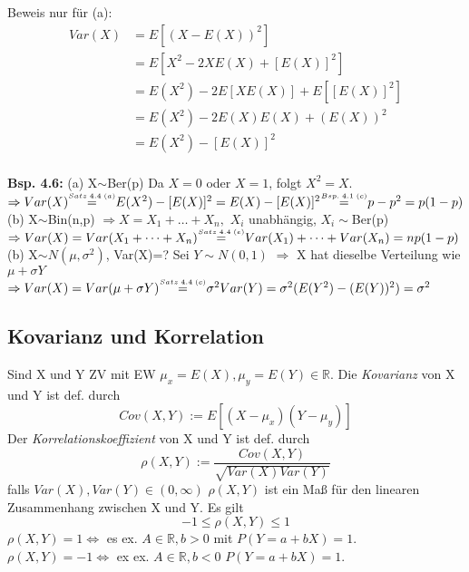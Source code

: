 \documentclass[a4paper,11pt]{article}
\newcommand\sfofoa{\overset{\mathclap{\scriptscriptstyle Satz \hspace{2pt} 4.4 \hspace{2pt} (a)}}{=}}
\newcommand\bspfoonc{\overset{\mathclap{\scriptscriptstyle Bsp. \hspace{2pt} 4.1 \hspace{2pt} (c)}}{=}}
\newcommand\sfofoe{\overset{\mathclap{\scriptscriptstyle Satz \hspace{2pt} 4.4 \hspace{2pt} (e)}}{=}}
\newcommand\sfofoc{\overset{\mathclap{\scriptscriptstyle Satz \hspace{2pt} 4.4 \hspace{2pt} (c)}}{=}}
\begin{document}
\noindent Beweis nur für (a):
\begin{align*}
Var(X) &= E[(X-E(X))^2]\\
&= E[X^2-2XE(X)+[E(X)]^2]\\
&= E(X^2)-2E[XE(X)]+E[[E(X)]^2]\\
&= E(X^2) - 2E(X)E(X) + (E(X))^2\\
&= E(X^2)-[E(X)]^2\\
\end{align*}

\vspace{6pt}
\noindent\textbf{Bsp. 4.6:} (a) X$\sim$Ber(p)
\newline Da $X=0$ oder $X=1$, folgt $X^2=X$. 
\newline $\Rightarrow Var(X) \hspace{12pt}\sfofoa\hspace{12pt} E(X^2)-[E(X)]^2=E(X)-[E(X)]^2 \hspace{12pt}\bspfoonc\hspace{12pt} p-p^2 = p(1-p)$
\vspace{4pt}
\noindent (b) X$\sim$Bin(n,p)
\newline $\Rightarrow X=X_1+\dots+X_n,$ $X_i$ unabhängig, $X_i\sim$Ber(p)
\newline $\Rightarrow Var(X)= Var(X_1+\dots+X_n) \hspace{12pt}\sfofoe\hspace{12pt} Var(X_1)+\dots+Var(X_n)=np(1-p)$
\vspace{4pt}
\noindent (b) X$\sim N(\mu,\sigma^2)$, Var(X)=?
\newline Sei $Y\sim N(0,1)$
\newline $\Rightarrow$ X hat dieselbe Verteilung wie $\mu+\sigma Y$
\newline $\Rightarrow Var(X)= Var(\mu + \sigma Y) \hspace{12pt}\sfofoc\hspace{12pt} \sigma^2Var(Y) = \sigma^2(E(Y^2)-(E(Y))^2)=\sigma^2$

\subsection{Kovarianz und Korrelation}
Sind X und Y ZV mit EW $\mu_x=E(X),\mu_y=E(Y)\in\mathbb{R}$.
\newline Die \textit{Kovarianz} von X und Y ist def. durch
\[Cov(X,Y):=E[(X-\mu_x)(Y-\mu_y)]\]
\newline Der \textit{Korrelationskoeffizient} von X und Y ist def. durch 
\[\rho(X,Y):=\frac{Cov(X,Y)}{\sqrt{Var(X)Var(Y)}}\]
falls $Var(X),Var(Y)\in(0,\infty)$
\newline $\rho(X,Y)$ ist ein Maß für den linearen Zusammenhang zwischen X und Y.
\newline Es gilt 
\[-1\leq\rho(X,Y)\leq1\]
$\rho(X,Y)=1 \Leftrightarrow$ es ex. $A\in\mathbb{R},b>0$ mit $P(Y=a+bX)=1$.
$\rho(X,Y)=-1 \Leftrightarrow$ ex ex. $A\in\mathbb{R},b<0$ $P(Y=a+bX)=1$.
\end{document}
